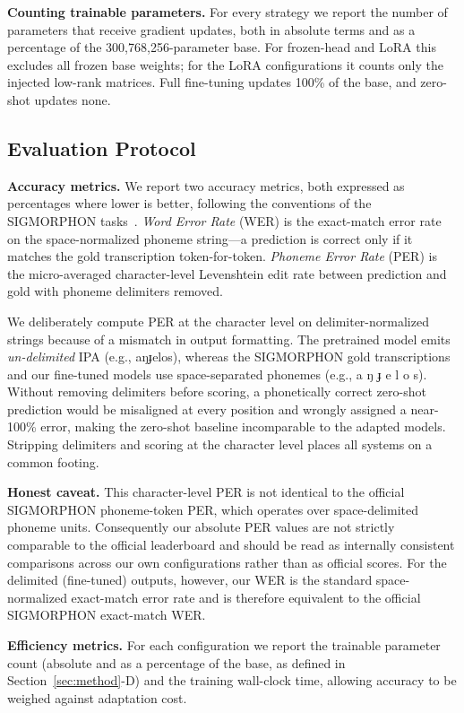 \documentclass[conference]{IEEEtran}
\newcommand{\ipa}[1]{{\ipafont #1}}
\begin{document}
\textbf{Counting trainable parameters.} For every strategy we report the number of parameters that receive gradient updates, both in absolute terms and as a percentage of the 300{,}768{,}256-parameter base. For frozen-head and LoRA this excludes all frozen base weights; for the LoRA configurations it counts only the injected low-rank matrices. Full fine-tuning updates 100\% of the base, and zero-shot updates none.

\subsection{Evaluation Protocol}

\textbf{Accuracy metrics.} We report two accuracy metrics, both expressed as percentages where lower is better, following the conventions of the SIGMORPHON tasks~\cite{gorman2020,ashby2021}. \emph{Word Error Rate} (WER) is the exact-match error rate on the space-normalized phoneme string---a prediction is correct only if it matches the gold transcription token-for-token. \emph{Phoneme Error Rate} (PER) is the micro-averaged character-level Levenshtein edit rate between prediction and gold with phoneme delimiters removed.

We deliberately compute PER at the character level on delimiter-normalized strings because of a mismatch in output formatting. The pretrained model emits \emph{un-delimited} IPA (e.g., \ipa{aŋɟelos}), whereas the SIGMORPHON gold transcriptions and our fine-tuned models use space-separated phonemes (e.g., \ipa{a ŋ ɟ e l o s}). Without removing delimiters before scoring, a phonetically correct zero-shot prediction would be misaligned at every position and wrongly assigned a near-100\% error, making the zero-shot baseline incomparable to the adapted models. Stripping delimiters and scoring at the character level places all systems on a common footing.

\textbf{Honest caveat.} This character-level PER is not identical to the official SIGMORPHON phoneme-token PER, which operates over space-delimited phoneme units. Consequently our absolute PER values are not strictly comparable to the official leaderboard and should be read as internally consistent comparisons across our own configurations rather than as official scores. For the delimited (fine-tuned) outputs, however, our WER is the standard space-normalized exact-match error rate and is therefore equivalent to the official SIGMORPHON exact-match WER.

\textbf{Efficiency metrics.} For each configuration we report the trainable parameter count (absolute and as a percentage of the base, as defined in Section~\ref{sec:method}-D) and the training wall-clock time, allowing accuracy to be weighed against adaptation cost.
\end{document}
